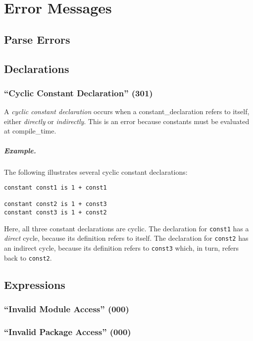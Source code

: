 \chapter{Error Messages}

\section{Parse Errors}

\section{Declarations}

\subsection{``Cyclic Constant Declaration'' (301)}

A {\em cyclic constant declaration} occurs when a \gls{constant_declaration} refers to itself, either {\em directly} or {\em indirectly}.  This is an error because constants must be evaluated at \gls{compile_time}.

\paragraph{Example.}  The following illustrates several cyclic constant declarations:

\begin{lstlisting}
constant const1 is 1 + const1

constant const2 is 1 + const3
constant const3 is 1 + const2
\end{lstlisting}
Here, all three constant declarations are cyclic.  The declaration for \lstinline{const1} has a {\em direct} cycle, because its definition refers to itself.  The declaration for \lstinline{const2} has an indirect cycle, because its definition refers to \lstinline{const3} which, in turn, refers back to \lstinline{const2}.

\section{Expressions}

\subsection{``Invalid Module Access'' (000)}

\subsection{``Invalid Package Access'' (000)}

